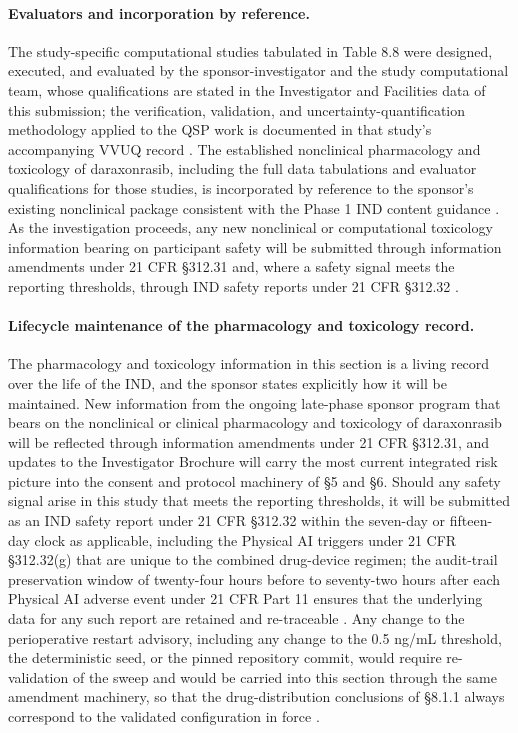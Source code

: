 \paragraph{Evaluators and incorporation by reference.}
The study-specific computational studies tabulated in Table 8.8 were designed,
executed, and evaluated by the sponsor-investigator and the study computational
team, whose qualifications are stated in the Investigator and Facilities data of
this submission; the verification, validation, and uncertainty-quantification
methodology applied to the QSP work is documented in that study's accompanying
VVUQ record \cite{qspmetpancre}. The established nonclinical pharmacology and
toxicology of daraxonrasib, including the full data tabulations and evaluator
qualifications for those studies, is incorporated by reference to the sponsor's
existing nonclinical package consistent with the Phase 1 IND content guidance
\cite{phase1guidance,daraxwhipple}. As the investigation proceeds, any new
nonclinical or computational toxicology information bearing on participant safety
will be submitted through information amendments under 21 CFR \S 312.31 and, where
a safety signal meets the reporting thresholds, through IND safety reports under
21 CFR \S 312.32 \cite{cfr312paiuni}.

\paragraph{Lifecycle maintenance of the pharmacology and toxicology record.}
The pharmacology and toxicology information in this section is a living record over
the life of the IND, and the sponsor states explicitly how it will be maintained.
New information from the ongoing late-phase sponsor program that bears on the
nonclinical or clinical pharmacology and toxicology of daraxonrasib will be
reflected through information amendments under 21 CFR \S 312.31, and updates to the
Investigator Brochure will carry the most current integrated risk picture into the
consent and protocol machinery of \S 5 and \S 6. Should any safety signal arise in
this study that meets the reporting thresholds, it will be submitted as an IND
safety report under 21 CFR \S 312.32 within the seven-day or fifteen-day clock as
applicable, including the Physical AI triggers under 21 CFR \S 312.32(g) that are
unique to the combined drug-device regimen; the audit-trail preservation window of
twenty-four hours before to seventy-two hours after each Physical AI adverse event
under 21 CFR Part 11 ensures that the underlying data for any such report are
retained and re-traceable \cite{cfr312paiuni,onpremwhippl}. Any change to the
perioperative restart advisory, including any change to the 0.5 ng/mL threshold, the
deterministic seed, or the pinned repository commit, would require re-validation of
the sweep and would be carried into this section through the same amendment
machinery, so that the drug-distribution conclusions of \S 8.1.1 always correspond
to the validated configuration in force \cite{onpremwhippl,clintrustpai}.

